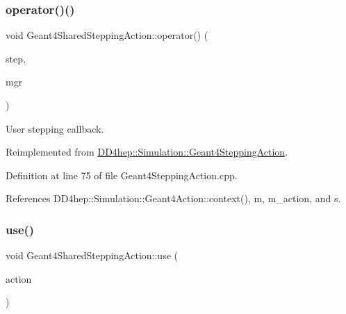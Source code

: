 \subsubsection{\texorpdfstring{operator()()}{operator()()}}
{\footnotesize\ttfamily void Geant4\+Shared\+Stepping\+Action\+::operator() (\begin{DoxyParamCaption}\item[{const G4\+Step $\ast$}]{step,  }\item[{G4\+Stepping\+Manager $\ast$}]{mgr }\end{DoxyParamCaption})\hspace{0.3cm}{\ttfamily [virtual]}}



User stepping callback. 



Reimplemented from \hyperlink{class_d_d4hep_1_1_simulation_1_1_geant4_stepping_action_ab6b61f6eaed6d06ddb3a7ed319258317}{D\+D4hep\+::\+Simulation\+::\+Geant4\+Stepping\+Action}.



Definition at line 75 of file Geant4\+Stepping\+Action.\+cpp.



References D\+D4hep\+::\+Simulation\+::\+Geant4\+Action\+::context(), m, m\+\_\+action, and s.

\hypertarget{class_d_d4hep_1_1_simulation_1_1_geant4_shared_stepping_action_a2c04725bc0820515ab86fde2ead70829}{}\label{class_d_d4hep_1_1_simulation_1_1_geant4_shared_stepping_action_a2c04725bc0820515ab86fde2ead70829} 
\subsubsection{\texorpdfstring{use()}{use()}}
{\footnotesize\ttfamily void Geant4\+Shared\+Stepping\+Action\+::use (\begin{DoxyParamCaption}\item[{\hyperlink{class_d_d4hep_1_1_simulation_1_1_geant4_stepping_action}{Geant4\+Stepping\+Action} $\ast$}]{action }\end{DoxyParamCaption})\hspace{0.3cm}{\ttfamily [virtual]}}



